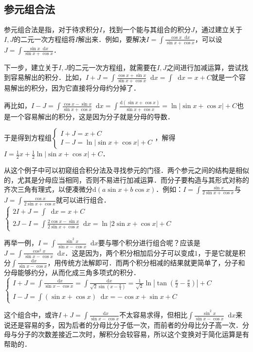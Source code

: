\documentclass{ctexbook}
\newcommand*{\dif}{\mathop{}\!\mathrm{d}}
\begin{document}
\subsection{参元组合法}
参元组合法是指，对于待求积分$I$，找到一个能与其组合的积分$J$，通过建立关于$I,J$的二元一次方程组将$I$解出来．例如，要解决$I=\int\frac{\cos{x}\dif{x}}{\sin{x}+\cos{x}}$，可以设$J=\int\frac{\sin{x}\dif{x}}{\sin{x}+\cos{x}}$．\par
下一步，建立关于$I,J$的二元一次方程组，就需要在$I,J$之间进行加减运算，尝试找到容易解出的积分．比如，$I+J=\int\frac{\cos{x}+\sin{x}}{\sin{x}+\cos{x}}\dif{x}=\int\dif{x}=x+C$就是一个容易解出的积分，因为它直接将分母约分掉了．\par
再比如，$I-J=\int\frac{\cos{x}-\sin{x}}{\sin{x}+\cos{x}}\dif{x}=\int\frac{\mathrm{d}\left(\sin{x}+\cos{x}\right)}{\sin{x}+\cos{x}}=\ln{|\sin{x}+\cos{x}|}+C$也是一个容易解出的积分，这是因为分子就是分母的导数．\par
于是得到方程组$\begin{cases}I+J=x+C\\I-J=\ln{|\sin{x}+\cos{x}|}+C\end{cases}$，解得$I=\frac{1}{2}x+\frac{1}{2}\ln{|\sin{x}+\cos{x}|}+C$．\par
从这个例子中可以初窥组合积分法及寻找参元的门径．两个参元之间的结构是相似的，尤其是分母应当相同，否则不易进行加减运算．而分子要构造与其形式对称的齐次三角有理式，以便凑微分$\mathrm{d}\left(a\sin{x}+b\cos{x}\right)$．例如：$I=\int\frac{\sin{x}}{2\sin{x}+\cos{x}}$与$J=\int\frac{\cos{x}}{2\sin{x}+\cos{x}}$就可以进行组合．\\
$\begin{cases}2I+J=\int\dif{x}=x+C\\2J-I=\int\frac{2\cos{x}-\sin{x}}{2\sin{x}+\cos{x}}\dif{x}=\ln{|2\sin{x}+\cos{x}|}+C\end{cases}$\par
再举一例，$I=\int\frac{\sin^{2}{x}}{\sin{x}-\cos{x}}\dif{x}$要与哪个积分进行组合呢？应该是$J=\int\frac{\cos^{2}{x}}{\sin{x}-\cos{x}}\dif{x}$．这是因为，两个积分相加后分子可以变成$1$，于是它就是积分$\int\frac{\dif{x}}{\sin{x}-\cos{x}}$，用传统方法解即可．而两个积分相减的结果就更简单了，分子和分母能够约分，从而化成三角多项式的积分．\\
$\begin{cases}I+J=\int\frac{\dif{x}}{\sin{x}-\cos{x}}=\int\frac{\dif{x}}{\sqrt{2}\sin{\left(x-\frac{\pi}{4}\right)}}=\frac{1}{\sqrt{2}}\ln{|\tan{\left(\frac{x}{2}-\frac{\pi}{8}\right)}|}+C\\I-J=\int\left(\sin{x}+\cos{x}\right)\dif{x}=-\cos{x}+\sin{x}+C\end{cases}$\par
这个组合中，或许$I+J=\int\frac{\dif{x}}{\sin{x}-\cos{x}}$不太容易求得，但相比$\int\frac{\sin^{2}{x}}{\sin{x}-\cos{x}}\dif{x}$来说还是容易的多，因为后者的分母比分子低一次，而前者的分母比分子高一次．分母与分子的次数差接近二次时，解积分会较容易，所以这个变换对于简化运算是有帮助的．\par
\end{document}
